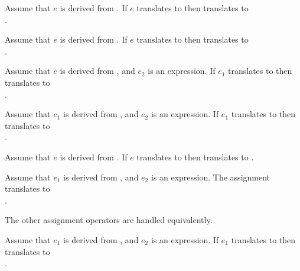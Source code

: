 \documentclass[makeidx]{article}
\begin{document}
{{\LMHash{}%
Assume that $e$ is derived from .
If $e$ translates to  then
translates to\\
.
\EndCase

\LMHash{}%
Assume that $e$ is derived from .
If $e$ translates to  then
translates to\\
.
\EndCase

\LMHash{}%
Assume that $e$ is derived from ,
and $e_2$ is an expression.
If $e_1$ translates to  then 
translates to\\
.
\EndCase

\LMHash{}%
Assume that $e_1$ is derived from ,
and $e_2$ is an expression.
If $e_1$ translates to  then 
translates to\\
.
\EndCase

\LMHash{}%
Assume that $e$ is derived from .
If $e$ translates to  then 
translates to
.
\EndCase

\LMHash{}%
Assume that $e_1$ is derived from ,
and $e_2$ is an expression.
The assignment 
translates to\\
.
\EndCase

\LMHash{}%
The other assignment operators are handled equivalently.
\EndCase

\LMHash{}%
Assume that $e_1$ is derived from ,
and $e_2$ is an expression.
If $e_1$ translates to  then 
translates to\\
.
\EndCase

}}
\end{document}
